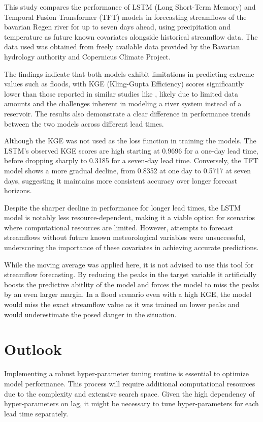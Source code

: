 \documentclass[
]{krantz}
\begin{document}
This study compares the performance of LSTM (Long Short-Term Memory) and Temporal Fusion Transformer (TFT) models in forecasting streamflows of the bavarian Regen river for up to seven days ahead, using precipitation and temperature as future known covariates alongside historical streamflow data. The data used was obtained from freely available data provided by the Bavarian hydrology authority and Copernicus Climate Project.

The findings indicate that both models exhibit limitations in predicting extreme values such as floods, with KGE (Kling-Gupta Efficiency) scores significantly lower than those reported in similar studies like \citet{sabzipour2023}, likely due to limited data amounts and the challenges inherent in modeling a river system instead of a reservoir. The results also demonstrate a clear difference in performance trends between the two models across different lead times.

Although the KGE was not used as the loss function in training the models. The LSTM's observed KGE scores are high starting at 0.9696 for a one-day lead time, before dropping sharply to 0.3185 for a seven-day lead time. Conversely, the TFT model shows a more gradual decline, from 0.8352 at one day to 0.5717 at seven days, suggesting it maintains more consistent accuracy over longer forecast horizons.

Despite the sharper decline in performance for longer lead times, the LSTM model is notably less resource-dependent, making it a viable option for scenarios where computational resources are limited. However, attempts to forecast streamflows without future known meteorological variables were unsuccessful, underscoring the importance of these covariates in achieving accurate predictions.

While the moving average was applied here, it is not advised to use this tool for streamflow forecasting. By reducing the peaks in the target variable it artificially boosts the predictive abitlity of the model and forces the model to miss the peaks by an even larger margin. In a flood scenario even with a high KGE, the model would miss the exact streamflow value as it was trained on lower peaks and would underestimate the posed danger in the situation.

\section{Outlook}\label{outlook}

Implementing a robust hyper-parameter tuning routine is essential to optimize model performance. This process will require additional computational resources due to the complexity and extensive search space. Given the high dependency of hyper-parameters on lag, it might be necessary to tune hyper-parameters for each lead time separately.
\end{document}
